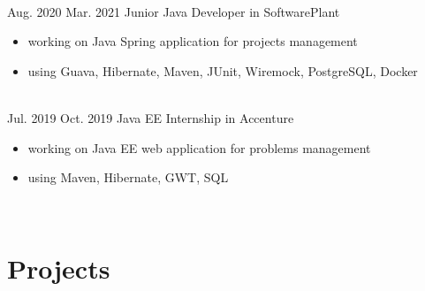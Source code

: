 \documentclass[a4paper]{twentysecondcv} %
\begin{document}
\begin{twenty}
{        }
        \\
        \twentyitem
        {Aug. 2020}
        {Mar. 2021}
        {Junior Java Developer in SoftwarePlant}
        {}
        {}
        {\begin{itemize}
             \item working on Java Spring application for projects management
             \item using Guava, Hibernate, Maven, JUnit, Wiremock, PostgreSQL, Docker
        \end{itemize}
        }
        \\
        \twentyitem
        {Jul. 2019}
        {Oct. 2019}
        {Java EE Internship in Accenture}
        {}
        {}
        {\begin{itemize}
             \item working on Java EE web application for problems management
             \item using Maven, Hibernate, GWT, SQL
        \end{itemize}
        }
        \\

    \end{twenty}

    \vspace{-0.6cm}

    \section{Projects}
\end{document}
